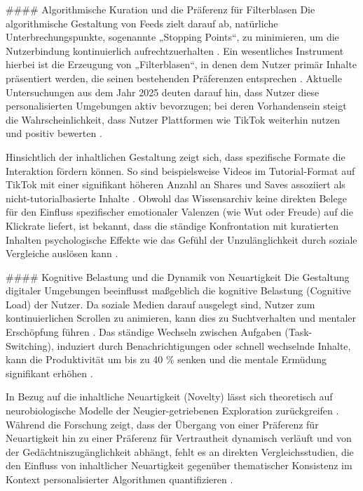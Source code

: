 \documentclass[11pt,a4paper]{article}
\begin{document}
\#\#\#\# Algorithmische Kuration und die Präferenz für Filterblasen Die algorithmische Gestaltung von Feeds zielt darauf ab, natürliche Unterbrechungspunkte, sogenannte „Stopping Points“, zu minimieren, um die Nutzerbindung kontinuierlich aufrechtzuerhalten \autocite{crossref_10_3389_fpsyg_2026_1787564}. Ein wesentliches Instrument hierbei ist die Erzeugung von „Filterblasen“, in denen dem Nutzer primär Inhalte präsentiert werden, die seinen bestehenden Präferenzen entsprechen \autocite{grey_grey_bbc8a51d8734471c850e8c2939fe8d32}. Aktuelle Untersuchungen aus dem Jahr 2025 deuten darauf hin, dass Nutzer diese personalisierten Umgebungen aktiv bevorzugen; bei deren Vorhandensein steigt die Wahrscheinlichkeit, dass Nutzer Plattformen wie TikTok weiterhin nutzen und positiv bewerten \autocite{grey_grey_bbc8a51d8734471c850e8c2939fe8d32}.

Hinsichtlich der inhaltlichen Gestaltung zeigt sich, dass spezifische Formate die Interaktion fördern können. So sind beispielsweise Videos im Tutorial-Format auf TikTok mit einer signifikant höheren Anzahl an Shares und Saves assoziiert als nicht-tutorialbasierte Inhalte \autocite{europepmc_41880228}. Obwohl das Wissensarchiv keine direkten Belege für den Einfluss spezifischer emotionaler Valenzen (wie Wut oder Freude) auf die Klickrate liefert, ist bekannt, dass die ständige Konfrontation mit kuratierten Inhalten psychologische Effekte wie das Gefühl der Unzulänglichkeit durch soziale Vergleiche auslösen kann \autocite{grey_grey_3467cac0f11d4b1e86319128da218a3e,grey_grey_f99abd6bfbd04efc8def60bb6988ce35,grey_grey_8407dc6841b0415a989fd351e0065df0}.

\#\#\#\# Kognitive Belastung und die Dynamik von Neuartigkeit Die Gestaltung digitaler Umgebungen beeinflusst maßgeblich die kognitive Belastung (Cognitive Load) der Nutzer. Da soziale Medien darauf ausgelegt sind, Nutzer zum kontinuierlichen Scrollen zu animieren, kann dies zu Suchtverhalten und mentaler Erschöpfung führen \autocite{grey_grey_3467cac0f11d4b1e86319128da218a3e}. Das ständige Wechseln zwischen Aufgaben (Task-Switching), induziert durch Benachrichtigungen oder schnell wechselnde Inhalte, kann die Produktivität um bis zu 40 \% senken und die mentale Ermüdung signifikant erhöhen \autocite{grey_grey_d4bc9c0d0e8441ba90398520e73af07d,grey_grey_b52a063f344f4bb6bb0b07a772233fbf}.

In Bezug auf die inhaltliche Neuartigkeit (Novelty) lässt sich theoretisch auf neurobiologische Modelle der Neugier-getriebenen Exploration zurückgreifen \autocite{openalex_W2003966687}. Während die Forschung zeigt, dass der Übergang von einer Präferenz für Neuartigkeit hin zu einer Präferenz für Vertrautheit dynamisch verläuft und von der Gedächtniszugänglichkeit abhängt, fehlt es an direkten Vergleichsstudien, die den Einfluss von inhaltlicher Neuartigkeit gegenüber thematischer Konsistenz im Kontext personalisierter Algorithmen quantifizieren \autocite{openalex_W2003966687}.
\end{document}
